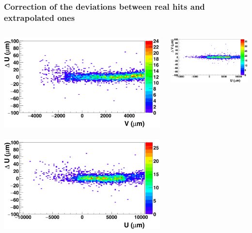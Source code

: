 \documentclass{beamer}
\begin{document}
  \begin{frame}[plain]
    \frametitle{Correction of the deviations between real hits and extrapolated ones}
  
    \vspace{-0.35cm}
    \begin{center}
      \begin{columns}[t]
        \begin{column}{4cm}
          \centering
          \includegraphics[width = 1.2\textwidth]{Pictures/deltaUV_8_corrected1.png}
          \
          \includegraphics[width = 1.2\textwidth]{Pictures/deltaUU_8_corrected1.png}
        \end{column}
        \begin{column}{4cm}
          \centering
          \includegraphics[width = 1.2\textwidth]{Pictures/deltaVU_8_corrected1.png}

\end{column}
\end{columns}
\end{center}
\end{frame}
\end{document}
